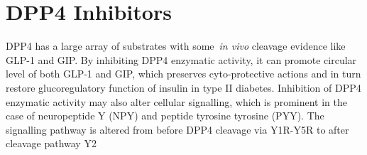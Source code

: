\section{DPP4 Inhibitors}
DPP4 has a large array of substrates with some~\textit{in vivo} cleavage evidence like GLP-1 and GIP. By inhibiting DPP4 enzymatic activity, it can promote circular level of both GLP-1 and GIP, which preserves cyto-protective actions and in turn restore glucoregulatory function of insulin in type II diabetes. Inhibition of DPP4 enzymatic activity may also alter cellular signalling, which is prominent in the case of neuropeptide Y (NPY) and peptide tyrosine tyrosine (PYY). The signalling pathway is altered from before DPP4 cleavage via Y1R-Y5R to after cleavage pathway Y2 